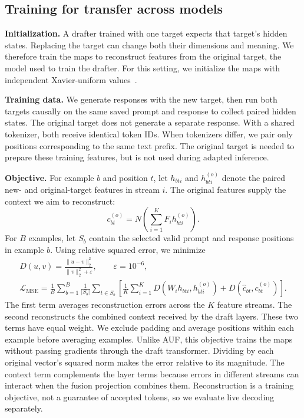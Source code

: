 \subsection{Training for transfer across models}
\label{sec:method-mse}
\textbf{Initialization.} A drafter trained with one target expects that target's hidden states. Replacing the target can change both their dimensions and meaning. We therefore train the maps to reconstruct features from the original target, the model used to train the drafter. For this setting, we initialize the maps with independent Xavier-uniform values~\citep{glorot2010initialization}.

\textbf{Training data.} We generate responses with the new target, then run both targets causally on the same saved prompt and response to collect paired hidden states. The original target does not generate a separate response. With a shared tokenizer, both receive identical token IDs. When tokenizers differ, we pair only positions corresponding to the same text prefix. The original target is needed to prepare these training features, but is not used during adapted inference.

\textbf{Objective.} For example $b$ and position $t$, let $h_{bti}$ and $h^{(o)}_{bti}$ denote the paired new- and original-target features in stream $i$. The original features supply the context we aim to reconstruct:
\begin{equation}
 c^{(o)}_{bt}=N\!\left(\sum_{i=1}^{K}F_i h^{(o)}_{bti}\right).
 \label{eq:original-context}
\end{equation}
For $B$ examples, let $S_b$ contain the selected valid prompt and response positions in example $b$. Using relative squared error, we minimize
\begin{gather}
 D(u,v)=\frac{\lVert u-v\rVert_2^2}{\lVert v\rVert_2^2+\varepsilon},
 \qquad \varepsilon=10^{-6},
 \label{eq:relative-error}\\
 \mathcal L_{\mathrm{MSE}}
 =\frac1B\sum_{b=1}^{B}\frac1{|S_b|}\sum_{t\in S_b}
 \left[\frac1K\sum_{i=1}^{K}D(W_i h_{bti},h^{(o)}_{bti})
 +D(\widehat c_{bt},c^{(o)}_{bt})\right].
 \label{eq:mse-method}
\end{gather}
The first term averages reconstruction errors across the $K$ feature streams. The second reconstructs the combined context received by the draft layers. These two terms have equal weight. We exclude padding and average positions within each example before averaging examples. Unlike AUF, this objective trains the maps without passing gradients through the draft transformer. Dividing by each original vector's squared norm makes the error relative to its magnitude. The context term complements the layer terms because errors in different streams can interact when the fusion projection combines them. Reconstruction is a training objective, not a guarantee of accepted tokens, so we evaluate live decoding separately.

